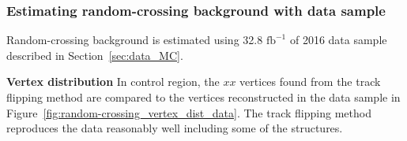 \subsubsection{Estimating random-crossing background with data sample}
\label{sec:random_crossing_data}
Random-crossing background is estimated using 32.8 $\mathrm{fb^{-1}}$ of 2016 data sample described in Section~\ref{sec:data_MC}.

\textbf{Vertex distribution} In control region, the $xx$ vertices found from the track flipping method are compared to the vertices reconstructed in the data sample in Figure~\ref{fig:random-crossing_vertex_dist_data}. The track flipping method reproduces the data reasonably well including some of the structures. 

\begin{figure}[!htb]
    \centering
     \\

\end{figure}
